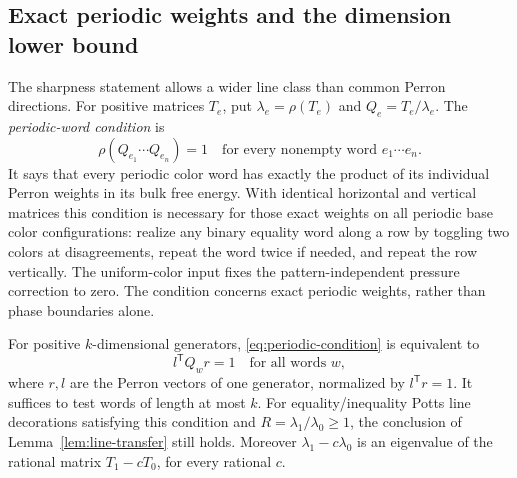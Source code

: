 \subsection{Exact periodic weights and the dimension lower bound}\label{sec:periodic}

The sharpness statement allows a wider line class than common Perron directions. For positive matrices \(T_e\), put \(\lambda_e=\rho(T_e)\) and \(Q_e=T_e/\lambda_e\). The \emph{periodic-word condition} is
\begin{equation}\label{eq:periodic-condition}
\rho(Q_{e_1}\cdots Q_{e_n})=1
\quad\text{for every nonempty word }e_1\cdots e_n.
\end{equation}
It says that every periodic color word has exactly the product of its individual Perron weights in its bulk free energy. With identical horizontal and vertical matrices this condition is necessary for those exact weights on all periodic base color configurations: realize any binary equality word along a row by toggling two colors at disagreements, repeat the word twice if needed, and repeat the row vertically. The uniform-color input fixes the pattern-independent pressure correction to zero. The condition concerns exact periodic weights, rather than phase boundaries alone.

\begin{lemma}\label{lem:periodic}
For positive \(k\)-dimensional generators, \eqref{eq:periodic-condition} is equivalent to
\[
l^{\mathsf T}Q_wr=1\quad\text{for all words }w,
\]
where \(r,l\) are the Perron vectors of one generator, normalized by \(l^{\mathsf T}r=1\). It suffices to test words of length at most \(k\). For equality/inequality Potts line decorations satisfying this condition and \(R=\lambda_1/\lambda_0\ge1\), the conclusion of Lemma~\ref{lem:line-transfer} still holds. Moreover \(\lambda_1-c\lambda_0\) is an eigenvalue of the rational matrix \(T_1-cT_0\), for every rational \(c\).
\end{lemma}

